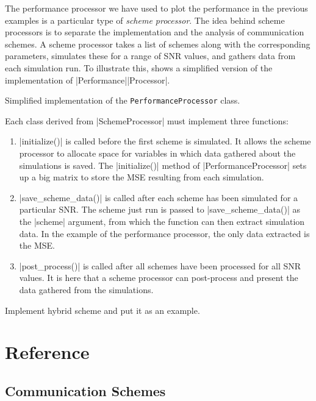 The performance processor we have used to plot the performance in the previous
examples is a particular type of \emph{scheme processor}. The idea behind scheme
processors is to separate the implementation and the analysis of communication
schemes. A scheme processor takes a list of schemes along
with the corresponding parameters, simulates these for a range of SNR
values, and gathers data from each simulation run.  To illustrate
this,  shows a simplified version of the implementation of
|Performance|\-|Processor|. 

\begin{listing}
\caption{Simplified implementation of the \texttt{PerformanceProcessor} class.}
\label{lst:perfproc}
\end{listing}

Each class derived from |SchemeProcessor| must implement three functions:
\begin{enumerate}
  \item |initialize()| is called before the first scheme is simulated. It allows
    the scheme processor to allocate space for variables in which data gathered
    about the simulations is saved. The |initialize()| method of
    |PerformanceProcessor| sets up a big matrix to store the MSE resulting from
    each simulation. 

  \item |save_scheme_data()| is called after each scheme has been
    simulated for a particular SNR. The scheme just run is passed to
    |save_scheme_data()| as the |scheme| argument, from which the function can
    then extract simulation data. In the example of the performance processor,
    the only data extracted is the MSE.

  \item |post_process()| is called after all schemes have been processed
    for all SNR values. It is here that a scheme processor can post-process and
    present the data gathered from the simulations.
\end{enumerate}


\todo Implement hybrid scheme and put it as an example.


\section{Reference}

\subsection{Communication Schemes}

